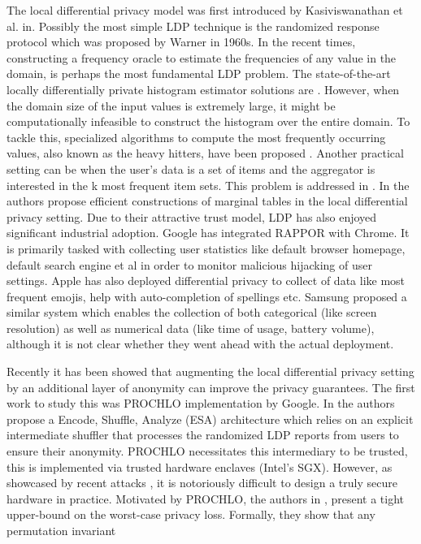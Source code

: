 \par
The local differential privacy model was first introduced by Kasiviswanathan
et al. in\cite{Kasivi}. Possibly the most simple LDP technique is the randomized response \cite{RR} protocol which was proposed by Warner in 1960s.  In the recent times, constructing a frequency oracle to estimate the frequencies of any value in the domain, is perhaps the most fundamental LDP problem. The state-of-the-art locally differentially private histogram estimator solutions are \cite{LDP1, LDP2, Rappor1}.  However, when the domain size of the input values is extremely large, it might be computationally infeasible to construct the histogram over the entire domain. To tackle this, specialized algorithms to compute the most frequently occurring values, also known as the heavy hitters, have been proposed \cite{HH,Rappor2,HH2}. Another practical setting can be when the user's data is a set of items and the aggregator is interested in  the k most frequent item sets. This problem is addressed in \cite{15,itemset}. In \cite{Cormode, CALM} the authors propose efficient constructions of marginal tables in the local differential privacy setting. Due to their attractive trust model, LDP has also enjoyed significant industrial adoption.  Google has integrated RAPPOR \cite{Rappor1, Rappor2} with Chrome. It is primarily tasked with collecting user statistics like default browser homepage, default search engine et al in order to monitor malicious hijacking of user settings. Apple \cite{Apple} has also deployed differential privacy to collect of data like most frequent emojis, help with auto-completion of spellings etc.  Samsung \cite{Samsung} proposed a similar system 
which enables the collection of both categorical 
(like screen resolution) as well as numerical data (like
time of usage, battery volume), although it is not clear
whether they went ahead with the actual deployment. 
\par
Recently it has been showed that augmenting the local differential privacy setting by an additional layer of anonymity can improve the privacy
guarantees. The first work to study this was PROCHLO \cite{Prochlo} implementation by Google. In \cite{Prochlo} the authors propose a  Encode, Shuffle, Analyze (ESA) architecture 
 which relies on an explicit intermediate shuffler that processes the randomized LDP reports
from users to ensure their anonymity. PROCHLO necessitates  this intermediary to be trusted, this is implemented via trusted hardware enclaves (Intel's SGX). However, as showcased by recent attacks \cite{Foreshadow}, it is notoriously difficult to design a  truly secure hardware in practice. Motivated by PROCHLO, the authors in \cite{amplification}, present a tight upper-bound on the worst-case privacy loss. Formally, they show that  any permutation invariant
